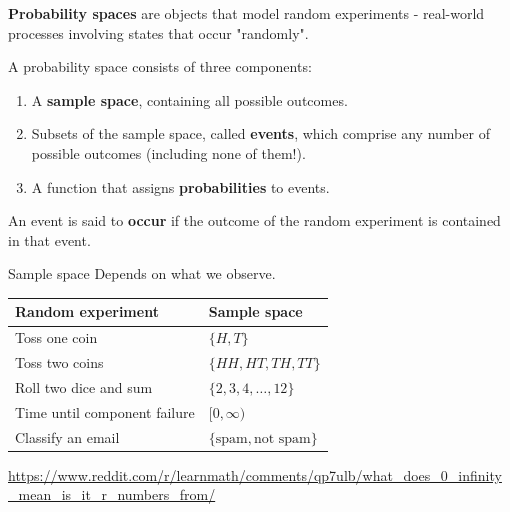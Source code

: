 \documentclass[12pt]{beamer}
\newcommand{\vocab}[1]{\textcolor{AggieMaroon}{\textbf{#1}}}
\begin{document}
\begin{frame}{}
\begin{block}{}
\vocab{Probability spaces} are objects that model random experiments - real-world processes involving states that occur "randomly".

\vspace{0.2cm}
A probability space consists of three components:
\begin{enumerate}
  \item A \vocab{sample space}, containing all possible outcomes.
  \item Subsets of the sample space, called \vocab{events}, which comprise any number of possible outcomes (including none of them!).
  \item A function that assigns \vocab{probabilities} to events.
\end{enumerate}

\vspace{0.2cm}
An event is said to \vocab{occur} if the outcome of the random experiment is contained in that event.
\end{block}
\end{frame}

\begin{frame}{}
\begin{block}{Sample space}
Depends on what we observe.

\vspace{0.3cm}
\begin{tabular}{>{\raggedright\arraybackslash}p{} >{\raggedright\arraybackslash}p{}}
\toprule
Random experiment & Sample space \\
\midrule
Toss one coin & $\{H,T\}$ \\
Toss two coins & $\{HH, HT, TH, TT\}$ \\
Roll two dice and sum & $\{2,3,4,\ldots,12\}$ \\
Time until component failure & $[0,\infty)$ \\
Classify an email & $\{\text{spam},\text{not spam}\}$ \\
\bottomrule
\end{tabular}
\end{block}

\vspace{2em}

\tiny{\url{https://www.reddit.com/r/learnmath/comments/qp7ulb/what_does_0_infinity_mean_is_it_r_numbers_from/}}
\end{frame}
\end{document}
